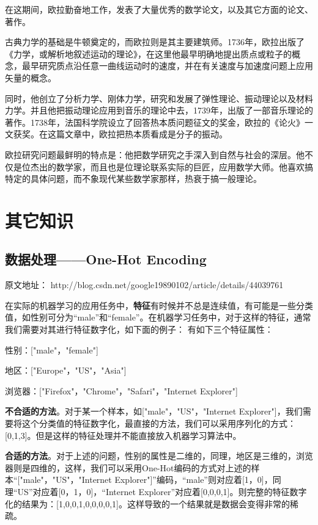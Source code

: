 \documentclass[UTF8]{ctexart}
\begin{document}
在这期间，欧拉勤奋地工作，发表了大量优秀的数学论文，以及其它方面的论文、著作。

古典力学的基础是牛顿奠定的，而欧拉则是其主要建筑师。1736年，欧拉出版了《力学，或解析地叙述运动的理论》，在这里他最早明确地提出质点或粒子的概念，最早研究质点沿任意一曲线运动时的速度，并在有关速度与加速度问题上应用矢量的概念。

同时，他创立了分析力学、刚体力学，研究和发展了弹性理论、振动理论以及材料力学。并且他把振动理论应用到音乐的理论中去，1739年，出版了一部音乐理论的著作。1738年，法国科学院设立了回答热本质问题征文的奖金，欧拉的《论火》一文获奖。在这篇文章中，欧拉把热本质看成是分子的振动。

欧拉研究问题最鲜明的特点是：他把数学研究之手深入到自然与社会的深层。他不仅是位杰出的数学家，而且也是位理论联系实际的巨匠，应用数学大师。他喜欢搞特定的具体问题，而不象现代某些数学家那样，热衰于搞一般理论。

\section{其它知识}

\subsection{数据处理——One-Hot Encoding}

原文地址： http://blog.csdn.net/google19890102/article/details/44039761

在实际的机器学习的应用任务中，\textbf{特征}有时候并不总是连续值，有可能是一些分类值，如性别可分为“male”和“female”。在机器学习任务中，对于这样的特征，通常我们需要对其进行特征数字化，如下面的例子：
有如下三个特征属性：

性别：["male"，"female"]

地区：["Europe"，"US"，"Asia"]

浏览器：["Firefox"，"Chrome"，"Safari"，"Internet Explorer"]

\textbf{不合适的方法}。对于某一个样本，如["male"，"US"，"Internet Explorer"]，我们需要将这个分类值的特征数字化，最直接的方法，我们可以采用序列化的方式：[0,1,3]。但是这样的特征处理并不能直接放入机器学习算法中。

\textbf{合适的方法}。对于上述的问题，性别的属性是二维的，同理，地区是三维的，浏览器则是四维的，这样，我们可以采用One-Hot编码的方式对上述的样本“["male"，"US"，"Internet Explorer"]”编码，“male”则对应着[1，0]，同理“US”对应着[0，1，0]，“Internet Explorer”对应着[0,0,0,1]。则完整的特征数字化的结果为：[1,0,0,1,0,0,0,0,1]。这样导致的一个结果就是数据会变得非常的稀疏。
\end{document}
